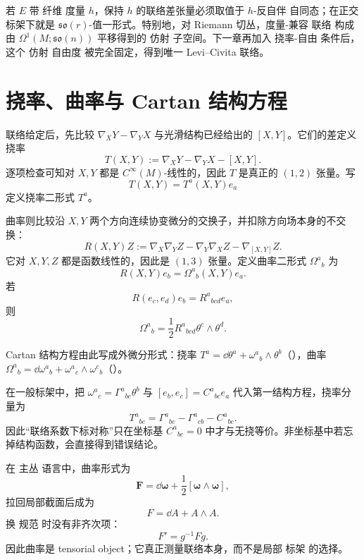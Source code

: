 若 $E$ 带 纤维 度量 $h$，保持 $h$ 的联络差张量必须取值于 $h$-反自伴 自同态；在正交标架下就是 $\mathfrak{so}(r)$-值一形式。特别地，对 Riemann 切丛，度量-兼容 联络 构成由 $\Omega^1(M;\mathfrak{so}(n))$ 平移得到的 仿射 子空间。下一章再加入 挠率-自由 条件后，这个 仿射 自由度 被完全固定，得到唯一 Levi--Civita 联络。

\section{挠率、曲率与 Cartan 结构方程}
联络给定后，先比较 $\nabla_XY-\nabla_YX$ 与光滑结构已经给出的 $[X,Y]$。它们的差定义挠率
\begin{equation*}T(X,Y)
:=\nabla_XY-\nabla_YX-[X,Y].
\end{equation*}
逐项检查可知对 $X,Y$ 都是 $C^\infty(M)$-线性的，因此 $T$ 是真正的 $(1,2)$ 张量。写
\[
T(X,Y)=T^a(X,Y)e_a
\]
定义挠率二形式 $T^a$。

曲率则比较沿 $X,Y$ 两个方向连续协变微分的交换子，并扣除方向场本身的不交换：
\begin{equation*}R(X,Y)Z
:=\nabla_X\nabla_YZ-\nabla_Y\nabla_XZ-\nabla_{[X,Y]}Z.
\end{equation*}
它对 $X,Y,Z$ 都是函数线性的，因此是 $(1,3)$ 张量。定义曲率二形式 $\Omega^a{}_b$ 为
\[
R(X,Y)e_b=\Omega^a{}_b(X,Y)e_a.
\]
若
\[
R(e_c,e_d)e_b=R^a{}_{bcd}e_a,
\]
则
\[
\Omega^a{}_b=\frac12R^a{}_{bcd}\theta^c\wedge\theta^d.
\]

Cartan 结构方程由此写成外微分形式：挠率 $T^a=\dd\theta^a+\omega^a{}_b\wedge\theta^b$（），曲率 $\Omega^a{}_b=\dd\omega^a{}_b+\omega^a{}_c\wedge\omega^c{}_b$（）。

在一般标架中，把 $\omega^a{}_c=\Gamma^a{}_{bc}\theta^b$ 与
$[e_b,e_c]=C^a{}_{bc}e_a$ 代入第一结构方程，挠率分量为
\begin{equation*}T^a{}_{bc}
=\Gamma^a{}_{bc}-\Gamma^a{}_{cb}-C^a{}_{bc}.
\end{equation*}
因此“联络系数下标对称”只在坐标基 $C^a{}_{bc}=0$ 中才与无挠等价。非坐标基中若忘掉结构函数，会直接得到错误结论。

在 主丛 语言中，曲率形式为
\begin{equation*}\mathbf F
=\dd\boldsymbol\omega
+\frac12[\boldsymbol\omega\wedge\boldsymbol\omega],\end{equation*}
拉回局部截面后成为
\begin{equation*}F=\dd A+A\wedge A.\end{equation*}
换 规范 时没有非齐次项：
\begin{equation*}F'=g^{-1}Fg.\end{equation*}
因此曲率是 tensorial object；它真正测量联络本身，而不是局部 标架 的选择。

